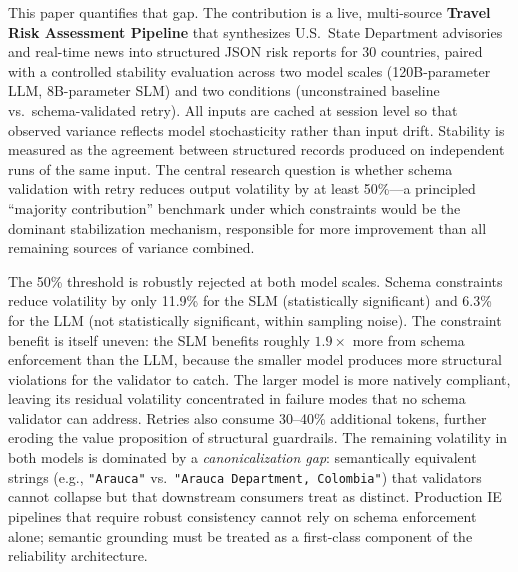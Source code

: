 \documentclass[sigconf]{acmart}
\begin{document}
This paper quantifies that gap. The contribution is a live, multi-source \textbf{Travel Risk Assessment Pipeline} that synthesizes U.S.\ State Department advisories and real-time news into structured JSON risk reports for 30 countries, paired with a controlled stability evaluation across two model scales (120B-parameter LLM, 8B-parameter SLM) and two conditions (unconstrained baseline vs.\ schema-validated retry). All inputs are cached at session level so that observed variance reflects model stochasticity rather than input drift. Stability is measured as the agreement between structured records produced on independent runs of the same input. The central research question is whether schema validation with retry reduces output volatility by at least 50\%---a principled ``majority contribution'' benchmark under which constraints would be the dominant stabilization mechanism, responsible for more improvement than all remaining sources of variance combined.

The 50\% threshold is robustly rejected at both model scales. Schema constraints reduce volatility by only 11.9\% for the SLM (statistically significant) and 6.3\% for the LLM (not statistically significant, within sampling noise). The constraint benefit is itself uneven: the SLM benefits roughly $1.9\times$ more from schema enforcement than the LLM, because the smaller model produces more structural violations for the validator to catch. The larger model is more natively compliant, leaving its residual volatility concentrated in failure modes that no schema validator can address. Retries also consume 30--40\% additional tokens, further eroding the value proposition of structural guardrails. The remaining volatility in both models is dominated by a \emph{canonicalization gap}: semantically equivalent strings (e.g., \texttt{"Arauca"} vs.\ \texttt{"Arauca Department, Colombia"}) that validators cannot collapse but that downstream consumers treat as distinct. Production IE pipelines that require robust consistency cannot rely on schema enforcement alone; semantic grounding must be treated as a first-class component of the reliability architecture.
\end{document}
